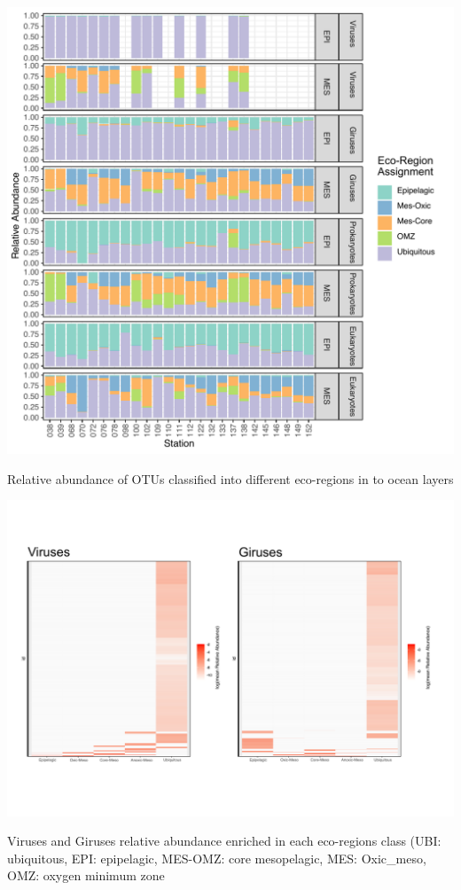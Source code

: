 \documentclass[fleqn,10pt]{wlscirep}
\begin{document}
\begin{suppfigure}[ht]
    \centering
    \includegraphics[scale=0.9]{images/simple_biome_projection_to_print.pdf}
    \caption{Relative abundance of OTUs classified into different eco-regions in to ocean layers}
    \label{fig:sim_biome}
\end{suppfigure}

\begin{suppfigure}[ht]
    \centering
    \includegraphics[scale=0.4]{images/heatmap_Vir_Gir.pdf}
    \caption{Viruses and Giruses relative abundance enriched in each eco-regions class (UBI: ubiquitous, EPI: epipelagic, MES-OMZ: core mesopelagic, MES: Oxic\_meso, OMZ: oxygen minimum zone}
    \label{fig:tax_virus_heatmap}
\end{suppfigure}
\end{document}
